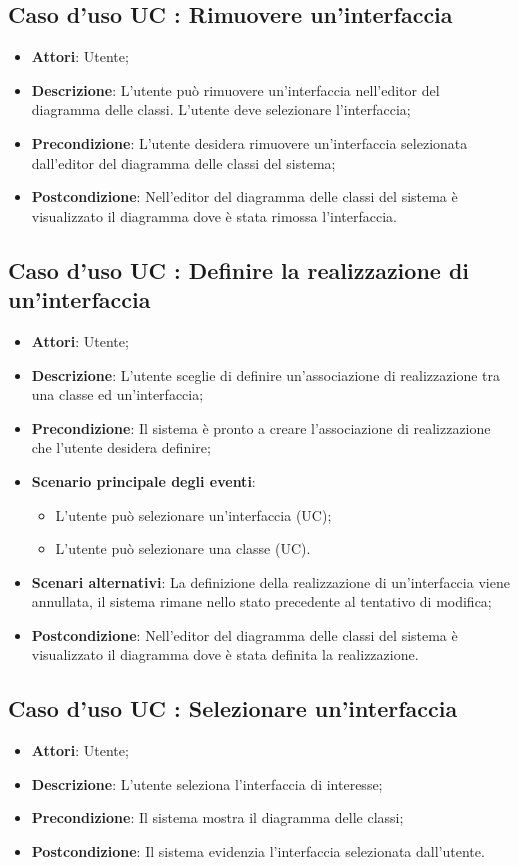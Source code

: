 \documentclass[../AnalisiDeiRequisiti.tex]{subfiles}
\begin{document}
		\subsection{Caso d'uso UC : Rimuovere un'interfaccia}
			\begin{itemize}
				\item \textbf{Attori}: Utente;
				\item \textbf{Descrizione}: L'utente può rimuovere un'interfaccia nell'editor
				del diagramma delle classi. L'utente deve selezionare l'interfaccia;
				\item \textbf{Precondizione}: L'utente desidera rimuovere un'interfaccia
				selezionata dall'editor del diagramma delle classi del sistema;
				\item \textbf{Postcondizione}: Nell'editor del diagramma delle classi del
				sistema è visualizzato il diagramma dove è stata rimossa l'interfaccia.
			\end{itemize}
		\subsection{Caso d'uso UC : Definire la realizzazione di un'interfaccia}
			\begin{itemize}
				\item \textbf{Attori}: Utente;
				\item \textbf{Descrizione}: L'utente sceglie di definire un'associazione di
				realizzazione tra una classe ed un'interfaccia;
				\item \textbf{Precondizione}: Il sistema è pronto a creare l'associazione di
				realizzazione che l'utente desidera definire;
				\item \textbf{Scenario principale degli eventi}:
					\begin{itemize}
						\item L'utente può selezionare un'interfaccia (UC);
						\item L'utente può selezionare una classe (UC).
					\end{itemize}
				\item \textbf{Scenari alternativi}: La definizione della realizzazione di
				un'interfaccia viene annullata, il sistema rimane nello stato precedente al
				tentativo di modifica;
				\item \textbf{Postcondizione}: Nell'editor del diagramma delle classi del
				sistema è visualizzato il diagramma dove è stata definita la realizzazione.
			\end{itemize}
		\subsection{Caso d'uso UC : Selezionare un'interfaccia}
			\begin{itemize}
				\item \textbf{Attori}: Utente;
				\item \textbf{Descrizione}: L'utente seleziona l'interfaccia di interesse;
				\item \textbf{Precondizione}: Il sistema mostra il diagramma delle classi;
				\item \textbf{Postcondizione}: Il sistema evidenzia l'interfaccia selezionata
				dall'utente.
			\end{itemize}
\end{document}

